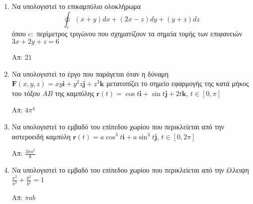 \begin{enumerate}
\begin{enumerate}[i)]
        \end{enumerate}

    \item Να υπολογιστεί το επικαμπύλιο ολοκλήρωμα 
        \[ 
            \oint_{c} (x+y)dx + (2x-z)dy + (y+z)dz 
\]
όπου $ c: $ περίμετρος τριγώνου που σχηματίζουν τα σημεία τομής των επιφανειών $ 3x+2y+z=6 $ 

\hfill Απ: $ 21 $ 


\item Να υπολογιστεί το έργο που παράγεται όταν η δύναμη $ \mathbf{F}(x,y,z) = xy \mathbf{i} +
    y^{2}z \mathbf{j} + z^{3} \mathbf{k} $ μετατοπίζει το σημείο εφαρμογής της κατά μήκος του τόξου
    $ AB $ της καμπύλης $ \mathbf{r}(t) = \cos{t} \mathbf{i}+ \sin{t} \mathbf{j} + 2t \mathbf{k} $,
    $ t \in [0,  \pi] $

    \hfill Απ: $ 4 \pi ^{4} $ 

\item Να υπολογιστεί το εμβαδό του επίπεδου χωρίου που περικλείεται από την αστεροειδή καμπύλη $
    \mathbf{r}(t) = a \cos^{3}{t} \mathbf{i} + a \sin^{3}{t} \mathbf{j} $, $ t \in [0, 2 \pi] $

    \hfill Απ: $ \frac{3 \pi a^{2}}{8} $ 

\item Να υπολογιστεί το εμβαδό του επίπεδου χωρίου που περικλείεται από την έλλειψη $
    \frac{x^{2}}{a^{2}} + \frac{y^{2}}{b^{2}} =1 $

    \hfill Απ: $ \pi a b $

\end{enumerate}






